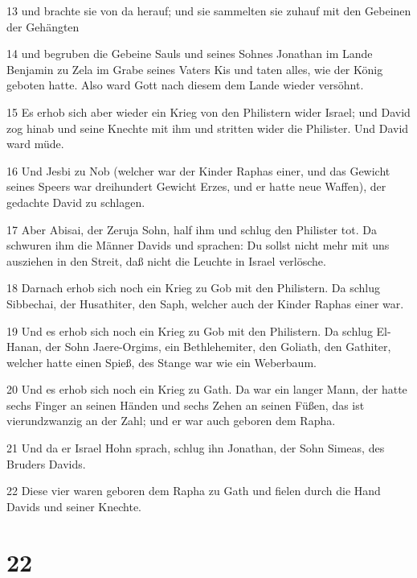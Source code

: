\par 13 und brachte sie von da herauf; und sie sammelten sie zuhauf mit den Gebeinen der Gehängten
\par 14 und begruben die Gebeine Sauls und seines Sohnes Jonathan im Lande Benjamin zu Zela im Grabe seines Vaters Kis und taten alles, wie der König geboten hatte. Also ward Gott nach diesem dem Lande wieder versöhnt.
\par 15 Es erhob sich aber wieder ein Krieg von den Philistern wider Israel; und David zog hinab und seine Knechte mit ihm und stritten wider die Philister. Und David ward müde.
\par 16 Und Jesbi zu Nob (welcher war der Kinder Raphas einer, und das Gewicht seines Speers war dreihundert Gewicht Erzes, und er hatte neue Waffen), der gedachte David zu schlagen.
\par 17 Aber Abisai, der Zeruja Sohn, half ihm und schlug den Philister tot. Da schwuren ihm die Männer Davids und sprachen: Du sollst nicht mehr mit uns ausziehen in den Streit, daß nicht die Leuchte in Israel verlösche.
\par 18 Darnach erhob sich noch ein Krieg zu Gob mit den Philistern. Da schlug Sibbechai, der Husathiter, den Saph, welcher auch der Kinder Raphas einer war.
\par 19 Und es erhob sich noch ein Krieg zu Gob mit den Philistern. Da schlug El-Hanan, der Sohn Jaere-Orgims, ein Bethlehemiter, den Goliath, den Gathiter, welcher hatte einen Spieß, des Stange war wie ein Weberbaum.
\par 20 Und es erhob sich noch ein Krieg zu Gath. Da war ein langer Mann, der hatte sechs Finger an seinen Händen und sechs Zehen an seinen Füßen, das ist vierundzwanzig an der Zahl; und er war auch geboren dem Rapha.
\par 21 Und da er Israel Hohn sprach, schlug ihn Jonathan, der Sohn Simeas, des Bruders Davids.
\par 22 Diese vier waren geboren dem Rapha zu Gath und fielen durch die Hand Davids und seiner Knechte.

\chapter{22}

